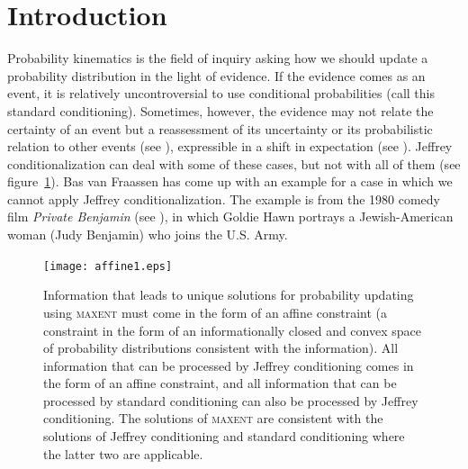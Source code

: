 \documentclass[11pt]{article}
\begin{document}
\section{Introduction}
\label{Introduction}

Probability kinematics is the field of inquiry asking how we should
update a probability distribution in the light of evidence. If the
evidence comes as an event, it is relatively uncontroversial to use
conditional probabilities (call this standard conditioning).
Sometimes, however, the evidence may not relate the certainty of an
event but a reassessment of its uncertainty or its probabilistic
relation to other events (see ),
expressible in a shift in expectation (see ).
Jeffrey conditionalization can deal with some of these cases, but not
with all of them (see figure~\ref{fig:aff}). Bas van Fraassen has come
up with an example for a case in which we cannot apply Jeffrey
conditionalization. The example is from the 1980 comedy film
\emph{Private Benjamin} (see )\nonsc{}, in
which Goldie Hawn portrays a Jewish-American woman (Judy Benjamin) who
joins the U.S. Army.

\begin{figure}[h!]
  \begin{flushright}
    \begin{minipage}[h]{.8\linewidth}
      \texttt{[image: affine1.eps]}
      \caption{Information that leads to unique solutions for
        probability updating using \textsc{maxent} must come in the
        form of an affine constraint (a constraint in the form of an
        informationally closed and convex space of probability
        distributions consistent with the information). All
        information that can be processed by Jeffrey conditioning
        comes in the form of an affine constraint, and all information
        that can be processed by standard conditioning can also be
        processed by Jeffrey conditioning. The solutions of
        \textsc{maxent} are consistent with the solutions of Jeffrey
        conditioning and standard conditioning where the latter two
        are applicable.}
      \label{fig:aff}
    \end{minipage}
  \end{flushright}
\end{figure}
\end{document}
